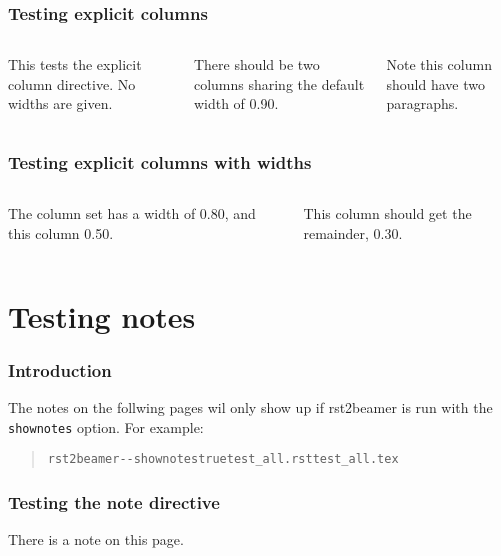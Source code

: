 \documentclass[t]{beamer}
\begin{document}
\begin{frame}[fragile]
\frametitle{Testing explicit columns}

\begin{columns}[T]

This tests the explicit column directive. No widths are given.


There should be two columns sharing the default width of 0.90.

Note this column should have two paragraphs.

\end{columns}

\end{frame}

\begin{frame}[fragile]
\frametitle{Testing explicit columns with widths}

\begin{columns}[T]

The column set has a width of 0.80, and this column 0.50.


This column should get the remainder, 0.30.

\end{columns}

\end{frame}


\section{Testing notes%
  \label{testing-notes}%
}

\begin{frame}[fragile]
\frametitle{Introduction}


The notes on the follwing pages wil only show up if rst2beamer is run with
the \texttt{shownotes} option. For example:
%
\begin{quote}
\begin{alltt}
rst2beamer -{}-shownotes true test_all.rst test_all.tex
\end{alltt}
\end{quote}

\end{frame}

\begin{frame}[fragile]
\frametitle{Testing the note directive}


There is a note on this page.

\end{frame}
\end{document}
